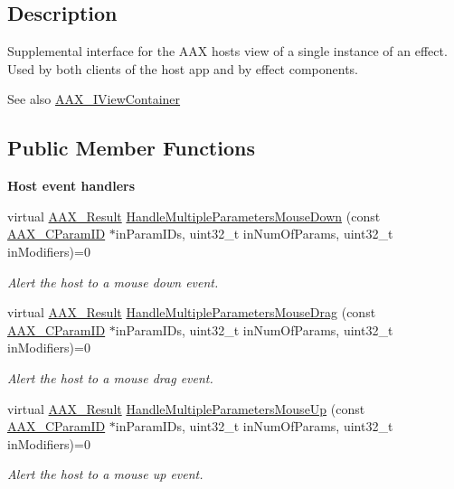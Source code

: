 \subsection{Description}
Supplemental interface for the A\+AX host\textquotesingle{}s view of a single instance of an effect. Used by both clients of the host app and by effect components. 

\begin{DoxySeeAlso}{See also}
\mbox{\hyperlink{a01889}{A\+A\+X\+\_\+\+I\+View\+Container}} 
\end{DoxySeeAlso}
\subsection*{Public Member Functions}
\begin{Indent}\textbf{ Host event handlers}\par
\begin{DoxyCompactItemize}
\item 
virtual \mbox{\hyperlink{a00392_a4d8f69a697df7f70c3a8e9b8ee130d2f}{A\+A\+X\+\_\+\+Result}} \mbox{\hyperlink{a01769_a38ba1d1e161cac126d34adf5d5b5f288}{Handle\+Multiple\+Parameters\+Mouse\+Down}} (const \mbox{\hyperlink{a00392_a1440c756fe5cb158b78193b2fc1780d1}{A\+A\+X\+\_\+\+C\+Param\+ID}} $\ast$in\+Param\+I\+Ds, uint32\+\_\+t in\+Num\+Of\+Params, uint32\+\_\+t in\+Modifiers)=0
\begin{DoxyCompactList}\small\item\em Alert the host to a mouse down event. \end{DoxyCompactList}\item 
virtual \mbox{\hyperlink{a00392_a4d8f69a697df7f70c3a8e9b8ee130d2f}{A\+A\+X\+\_\+\+Result}} \mbox{\hyperlink{a01769_aab92e32e54f43a12e02e1449b1d5b664}{Handle\+Multiple\+Parameters\+Mouse\+Drag}} (const \mbox{\hyperlink{a00392_a1440c756fe5cb158b78193b2fc1780d1}{A\+A\+X\+\_\+\+C\+Param\+ID}} $\ast$in\+Param\+I\+Ds, uint32\+\_\+t in\+Num\+Of\+Params, uint32\+\_\+t in\+Modifiers)=0
\begin{DoxyCompactList}\small\item\em Alert the host to a mouse drag event. \end{DoxyCompactList}\item 
virtual \mbox{\hyperlink{a00392_a4d8f69a697df7f70c3a8e9b8ee130d2f}{A\+A\+X\+\_\+\+Result}} \mbox{\hyperlink{a01769_a60e8745816704fe309ce9fa9de9d7d79}{Handle\+Multiple\+Parameters\+Mouse\+Up}} (const \mbox{\hyperlink{a00392_a1440c756fe5cb158b78193b2fc1780d1}{A\+A\+X\+\_\+\+C\+Param\+ID}} $\ast$in\+Param\+I\+Ds, uint32\+\_\+t in\+Num\+Of\+Params, uint32\+\_\+t in\+Modifiers)=0
\begin{DoxyCompactList}\small\item\em Alert the host to a mouse up event. \end{DoxyCompactList}\end{DoxyCompactItemize}
\end{Indent}


